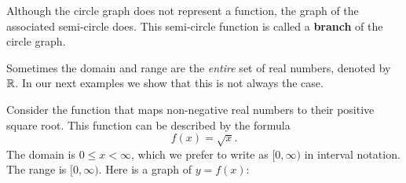 \documentclass{ximera}
\begin{document}
\begin{problem}
\begin{problem}
    \begin{multipleChoice}
    \end{multipleChoice}
    \begin{feedback}[correct]
        Although the circle graph does not represent a function, the graph of the associated semi-circle does.  This semi-circle function is called a \textbf{branch} of the circle graph.
    \end{feedback}
  \end{problem}
\end{problem} 

Sometimes the domain and range are the \textit{entire} set of real
numbers, denoted by $\mathbb R$. In our next examples we show that this is
not always the case.

\begin{example}
Consider the function that maps non-negative real numbers to their
positive square root. This function can be described by the
formula
\[
f(x) = \sqrt{x}.
\]
The domain is $0\le x<\infty$, which we prefer to write as
$[0,\infty)$ in interval notation. The range is $[0,\infty)$.  Here is
    a graph of $y=f(x)$:
\begin{image}
\end{image}
\end{example}
\end{document}
